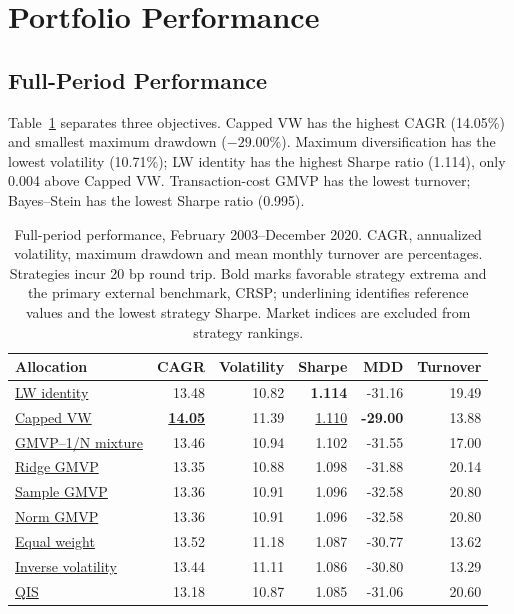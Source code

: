 \documentclass[letterpaper,journal]{IEEEtran}
\begin{document}
\section{Portfolio Performance}
\subsection{Full-Period Performance}


Table~\ref{tab:main} separates three objectives. Capped VW has the highest CAGR (14.05\%) and smallest maximum drawdown ($-29.00\%$). Maximum diversification has the lowest volatility (10.71\%); LW identity has the highest Sharpe ratio (1.114), only 0.004 above Capped VW. Transaction-cost GMVP has the lowest turnover; Bayes--Stein has the lowest Sharpe ratio (0.995).

\begin{table}[!tp]
\centering\caption{Full-period performance, February 2003--December 2020. CAGR, annualized volatility, maximum drawdown and mean monthly turnover are percentages. Strategies incur 20 bp round trip. Bold marks favorable strategy extrema and the primary external benchmark, CRSP; underlining identifies reference values and the lowest strategy Sharpe. Market indices are excluded from strategy rankings.}\label{tab:main}
\small\begin{tabular}{lrrrrr}\toprule
Allocation & CAGR & Volatility & Sharpe & MDD & Turnover\\\midrule
\hyperref[alloc:gmvp_lw_identity]{LW identity} & 13.48 & 10.82 & \textbf{1.114} & -31.16 & 19.49 \\
\hyperref[alloc:source_weight]{Capped VW} & \underline{\textbf{14.05}} & 11.39 & \underline{1.110} & \textbf{-29.00} & 13.88 \\
\hyperref[alloc:mix_1n]{GMVP--1/N mixture} & 13.46 & 10.94 & 1.102 & -31.55 & 17.00 \\
\hyperref[alloc:gmvp_ridge]{Ridge GMVP} & 13.35 & 10.88 & 1.098 & -31.88 & 20.14 \\
\hyperref[alloc:gmvp_sample]{Sample GMVP} & 13.36 & 10.91 & 1.096 & -32.58 & 20.80 \\
\hyperref[alloc:norm_gmvp]{Norm GMVP} & 13.36 & 10.91 & 1.096 & -32.58 & 20.80 \\
\hyperref[alloc:equal_weight]{Equal weight} & 13.52 & 11.18 & 1.087 & -30.77 & 13.62 \\
\hyperref[alloc:inverse_vol]{Inverse volatility} & 13.44 & 11.11 & 1.086 & -30.80 & 13.29 \\
\hyperref[alloc:gmvp_qis]{QIS} & 13.18 & 10.87 & 1.085 & -31.06 & 20.60 \\

\end{tabular}
\end{table}
\end{document}
